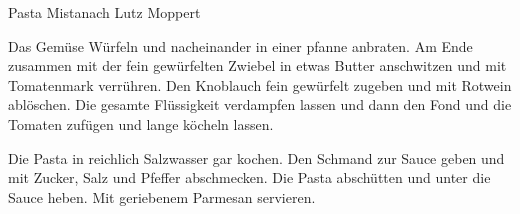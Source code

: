 \begin{recipe}{Pasta Mista}{nach Lutz Moppert}
  \inglist
  
  \steps
  Das Gemüse Würfeln und nacheinander in einer pfanne anbraten. Am Ende zusammen mit der
  fein gewürfelten Zwiebel in etwas Butter anschwitzen und mit Tomatenmark verrühren.
  Den Knoblauch fein gewürfelt zugeben und mit Rotwein ablöschen. Die gesamte Flüssigkeit
  verdampfen lassen und dann den Fond und die Tomaten zufügen und lange köcheln lassen.

  Die Pasta in reichlich Salzwasser gar kochen. Den Schmand zur Sauce geben und mit
  Zucker, Salz und Pfeffer abschmecken. Die Pasta abschütten und unter die Sauce heben.
  Mit geriebenem Parmesan servieren.
\end{recipe}
